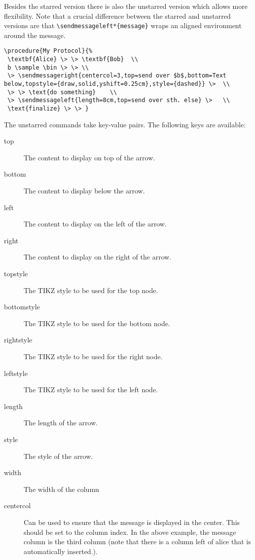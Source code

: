 \documentclass[a4paper]{report}
\begin{document}
Besides the starred version there is also the unstarred version which allows more flexibility. Note that a crucial difference between
the starred and unstarred versions are that  \lstinline$\sendmessageleft*{message}$ wraps an aligned environment around the message.
\begin{center}
\end{center}
\begin{lstlisting}
\procedure{My Protocol}{%
 \textbf{Alice} \> \> \textbf{Bob}  \\
 b \sample \bin \> \> \\
 \> \sendmessageright{centercol=3,top=send over $b$,bottom=Text below,topstyle={draw,solid,yshift=0.25cm},style={dashed}} \>  \\
 \> \> \text{do something}    \\
 \> \sendmessageleft{length=8cm,top=send over sth. else} \>   \\
 \text{finalize} \> \> }
\end{lstlisting}
The unstarred commands take key-value pairs. The following keys are available:
\begin{description}
\item[top]
The content to display on top of the arrow.
\item[bottom]
The content to display below the arrow.
\item[left]
The content to display on the left of the arrow.
\item[right]
The content to display on the right of the arrow.
\item[topstyle]
The TIKZ style to be used for the top node.
\item[bottomstyle]
The TIKZ style to be used for the bottom node.
\item[rightstyle]
The TIKZ style to be used for the right node.
\item[leftstyle]
The TIKZ style to be used for the left node.
\item[length]
The length of the arrow.
\item[style]
The style of the arrow.
\item[width]
The width of the column
\item[centercol]
Can be used to ensure that the message is displayed in the center. This should be set to the
column index. In the above example, the message column is the third column (note that there is
a column left of alice that  is automatically inserted.).
\end{description}
\end{document}
